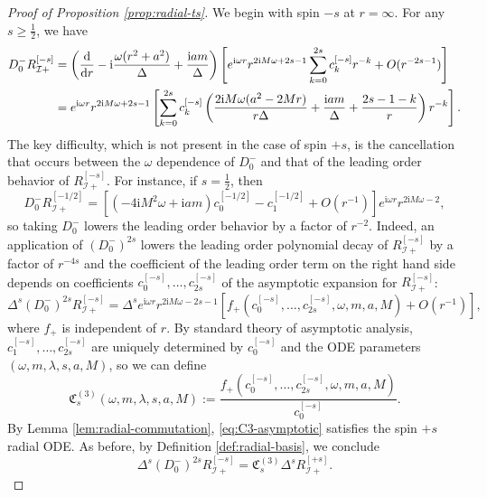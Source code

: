\documentclass[11pt]{article}
\newcommand{\dd}{\mathrm{d}}
\newcommand{\ii}{\mathrm{i}}
\newcommand{\cI}{\mathcal I}
\numberwithin{equation}{section}
\begin{document}
\begin{proof}[Proof of Proposition \ref{prop:radial-ts}]
We begin with spin $-s$ at $r=\infty$. For any $s\geq\frac12$, we have
\begin{align}
D^-_0R^{[-s]}_{\cI+}
&=\left(\frac{\dd}{\dd r}-\ii\frac{\omega(r^2+a^2)}{\Delta}+\frac{\ii am}{\Delta}\right)
\left[e^{\ii\omega r}r^{2\ii M\omega+2s-1}
\sum_{k=0}^{2s}c^{[-s]}_kr^{-k}+O(r^{-2s-1})\right]
\notag\\
&=e^{\ii\omega r}r^{2\ii M\omega+2s-1}
\left[
\sum_{k=0}^{2s}c^{[-s]}_k\left(\frac{2\ii M\omega (a^2-2M r)}{r\Delta}+\frac{\ii am}{\Delta}+\frac{2s-1-k}{r}\right)r^{-k}\right].
\label{eq:Dminus-Iplus}
\end{align}
The key difficulty, which is not present in the case of spin $+s$, is the cancellation that occurs between the $\omega$ dependence of $D^-_0$ and that of the leading order behavior of $R^{[-s]}_{\cI+}$. For instance, if $s=\frac12$, then
\begin{equation*}
D^-_0R^{[-1/2]}_{\cI+}
=\left[(-4\ii M^2\omega+\ii am)c^{[-1/2]}_0-c^{[-1/2]}_1+O(r^{-1})\right]
 e^{\ii\omega r}r^{2\ii M\omega-2},
\end{equation*}
so taking $D^-_0$ lowers the leading order behavior by a factor of $r^{-2}$. Indeed, an application of $(D^-_0)^{2s}$ lowers the leading order polynomial decay of $R^{[-s]}_{\cI+}$ by a factor of $r^{-4s}$ and the coefficient of the leading order term on the right hand side depends on coefficients $c^{[-s]}_0,\dots,c^{[-s]}_{2s}$ of the asymptotic expansion for $R^{[-s]}_{\cI+}$:
\begin{equation}\label{eq:C3-asymptotic}
\Delta^s(D^-_0)^{2s}R^{[-s]}_{\cI+}
=\Delta^s e^{\ii\omega r}r^{2\ii M\omega-2s-1}
\left[f_+\left(c^{[-s]}_0,\dots,c^{[-s]}_{2s},\omega,m,a, M\right)+O(r^{-1})\right],
\end{equation}
where $f_+$ is independent of $r$. By standard theory of asymptotic analysis, $c^{[-s]}_1,\dots,c^{[-s]}_{2s}$ are uniquely determined by $c^{[-s]}_0$ and the ODE parameters $(\omega,m,\lambda,s,a, M)$, so we can define
\begin{equation*}
\mathfrak C^{(3)}_s(\omega,m,\lambda,s,a, M):=
\frac{f_+\left(c^{[-s]}_0,\dots,c^{[-s]}_{2s},\omega,m,a, M\right)}{c^{[-s]}_0}.
\end{equation*}
By Lemma \ref{lem:radial-commutation}, \eqref{eq:C3-asymptotic} satisfies the spin $+s$ radial ODE. As before, by Definition \ref{def:radial-basis}, we conclude
\begin{equation*}
\Delta^s(D^-_0)^{2s}R^{[-s]}_{\cI+}=\mathfrak C^{(3)}_s\Delta^sR^{[+s]}_{\cI+}.
\end{equation*}


\end{proof}
\end{document}
